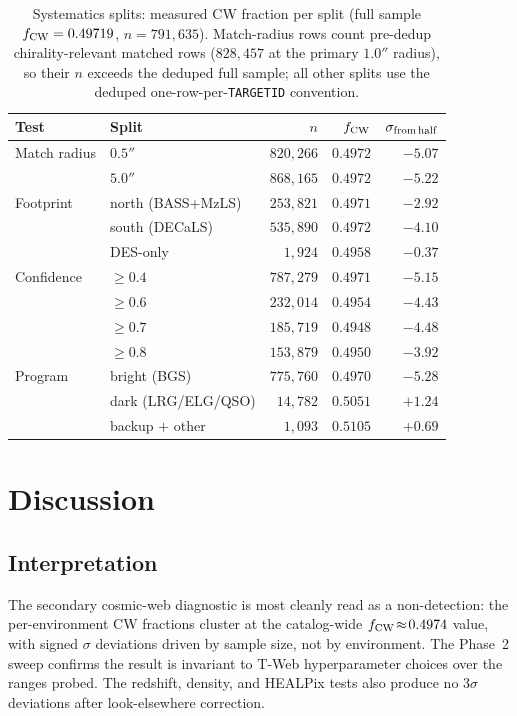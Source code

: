 \documentclass[aps,prd,twocolumn,superscriptaddress,showpacs,preprintnumbers,nofootinbib,longbibliography,floatfix]{revtex4-2}
\begin{document}
\begin{table}[ht]
\caption{Systematics splits: measured CW fraction per split
(full sample $f_{\rm CW} = 0.49719$, $n = 791{,}635$). Match-radius
rows count pre-dedup chirality-relevant matched rows ($828{,}457$ at
the primary $1.0''$ radius), so their $n$ exceeds the deduped full
sample; all other splits use the deduped one-row-per-\texttt{TARGETID}
convention.}
\label{tab:systematics_splits}
\begin{ruledtabular}
\begin{tabular}{llrrr}
Test & Split & $n$ & $f_{\rm CW}$ & $\sigma_{\rm from\,half}$ \\
\hline
Match radius & $0.5''$ & $820{,}266$ & $0.4972$ & $-5.07$ \\
             & $5.0''$ & $868{,}165$ & $0.4972$ & $-5.22$ \\
Footprint & north (BASS+MzLS) & $253{,}821$ & $0.4971$ & $-2.92$ \\
          & south (DECaLS) & $535{,}890$ & $0.4972$ & $-4.10$ \\
          & DES-only & $1{,}924$ & $0.4958$ & $-0.37$ \\
Confidence & $\ge 0.4$ & $787{,}279$ & $0.4971$ & $-5.15$ \\
           & $\ge 0.6$ & $232{,}014$ & $0.4954$ & $-4.43$ \\
           & $\ge 0.7$ & $185{,}719$ & $0.4948$ & $-4.48$ \\
           & $\ge 0.8$ & $153{,}879$ & $0.4950$ & $-3.92$ \\
Program & bright (BGS) & $775{,}760$ & $0.4970$ & $-5.28$ \\
        & dark (LRG/ELG/QSO) & $14{,}782$ & $0.5051$ & $+1.24$ \\
        & backup $+$ other & $1{,}093$ & $0.5105$ & $+0.69$ \\
\end{tabular}
\end{ruledtabular}
\end{table}

\section{Discussion}\label{sec:discussion}

\subsection{Interpretation}

The secondary cosmic-web diagnostic is most cleanly read as a non-detection: the
per-environment CW fractions cluster at the catalog-wide $f_{\rm CW}
\!\approx\! 0.4974$ value, with signed $\sigma$ deviations driven by
sample size, not by environment. The Phase~2 sweep confirms the result
is invariant to T-Web hyperparameter choices over the ranges probed.
The redshift, density, and HEALPix tests also produce no $3\sigma$
deviations after look-elsewhere correction.
\end{document}
